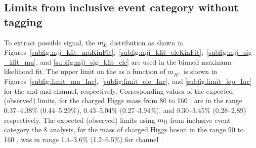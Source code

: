 \subsection{Limits from inclusive event category without  tagging}
\label{ss:limit_Inc}
To extract possible signal, the $m_\text{jj}$ distribution as shown in Figures~\ref{subfig:mjj_kfit_muKinFit},~\ref{subfig:mjj_kfit_eleKinFit},~\ref{subfig:mjj_sig_kfit_mu}, and \ref{subfig:mjj_sig_kfit_ele} are used in the binned maximum-likelihood fit. The upper limit on the \brThb as a function of $m_{H^{+}}$ is 
shown in Figures~\ref{subfig:limit_mu_Inc},~\ref{subfig:limit_ele_Inc}, and \ref{subfig:limit_lep_Inc}
for the \mujets and \ejets and \ljets channel, respectively. 
Corresponding values of the expected (observed) limits, for the 
charged Higgs mass from 80 to 160 \GeV, are in the range 
0.37--4.38\% (0.44--5.29\%), 0.43--5.04\% (0.27--3.94\%), 
and 0.30--3.45\% (0.28--2.89) respectively. The expected (observed) 
limits using $m_\text{jj}$ from inclusive event category the 8 \TeV analysis, 
for the mass of charged Higgs boson in the range 90 to 160 \GeV, was 
in range 1.4--3.6\% (1.2--6.5\%) for \ljets channel~\cite{Khachatryan:2015uua}.

